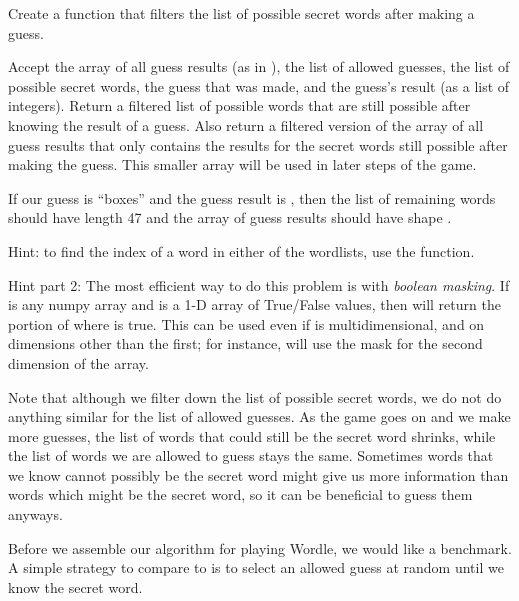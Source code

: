 \begin{problem}\label{infotheory:prob:filter}
	Create a function that filters the list of possible secret words after making a guess.

	Accept the array of all guess results (as in ), the list of allowed guesses, the list of possible secret words, the guess that was made, and the guess's result (as a list of integers).
	Return a filtered list of possible words that are still possible after knowing the result of a guess.
	Also return a filtered version of the array of all guess results that only contains the results for the secret words still possible after making the guess.
	This smaller array will be used in later steps of the game.

	If our guess is ``boxes'' and the guess result is \li{[0,0,0,2,1]}, then the list of remaining words should have length 47 and the array of guess results should have shape .

	Hint: to find the index of a word in either of the wordlists, use the  function.

	Hint part 2: The most efficient way to do this problem is with \emph{boolean masking}.
	If  is any numpy array and  is a 1-D array of True/False values, then  will return the portion of  where  is true.
	This can be used even if  is multidimensional, and on dimensions other than the first; for instance,  will use the mask for the second dimension of the array.

\end{problem}
\begin{info}
Note that although we filter down the list of possible secret words, we do not do anything similar for the list of allowed guesses.
As the game goes on and we make more guesses, the list of words that could still be the secret word shrinks, while the list of words we are allowed to guess stays the same.
Sometimes words that we know cannot possibly be the secret word might give us more information than words which might be the secret word, so it can be beneficial to guess them anyways.
\end{info}

Before we assemble our algorithm for playing Wordle, we would like a benchmark.
A simple strategy to compare to is to select an allowed guess at random until we know the secret word.

